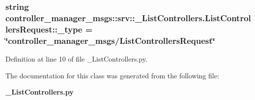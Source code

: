\subsubsection[{\-\_\-type}]{\setlength{\rightskip}{0pt plus 5cm}string {\bf controller\-\_\-manager\-\_\-msgs\-::srv\-::\-\_\-\-List\-Controllers.\-List\-Controllers\-Request\-::\-\_\-type} = \char`\"{}controller\-\_\-manager\-\_\-msgs/{\bf \-List\-Controllers\-Request}\char`\"{}\hspace{0.3cm}{\ttfamily  [static, private]}}\label{classcontroller__manager__msgs_1_1srv_1_1__ListControllers_1_1ListControllersRequest_a16da650577043223aa2f58c439df2e5f}


\-Definition at line 10 of file \-\_\-\-List\-Controllers.\-py.



\-The documentation for this class was generated from the following file\-:\begin{DoxyCompactItemize}
\item 
{\bf \-\_\-\-List\-Controllers.\-py}\end{DoxyCompactItemize}
